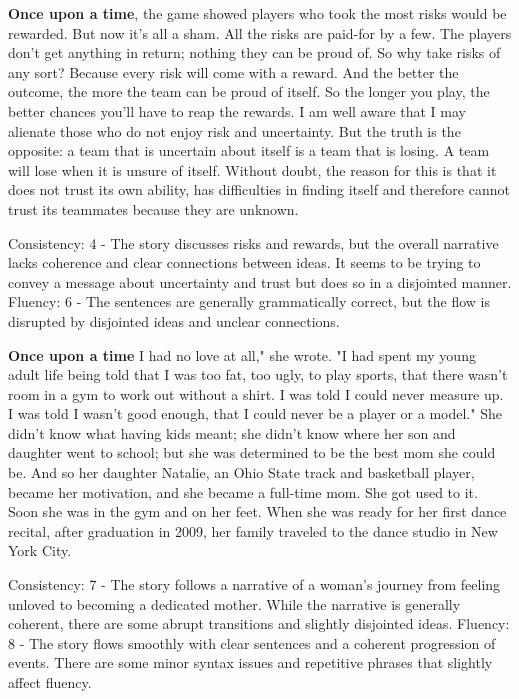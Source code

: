 \documentclass{article}
\begin{document}
\textbf{Once upon a time}, the game showed players who took the most risks would be rewarded. But now it's all a sham. All the risks are paid-for by a few. The players don't get anything in return; nothing they can be proud of. So why take risks of any sort? Because every risk will come with a reward. And the better the outcome, the more the team can be proud of itself. So the longer you play, the better chances you'll have to reap the rewards. I am well aware that I may alienate those who do not enjoy risk and uncertainty. But the truth is the opposite: a team that is uncertain about itself is a team that is losing. A team will lose when it is unsure of itself. Without doubt, the reason for this is that it does not trust its own ability, has difficulties in finding itself and therefore cannot trust its teammates because they are unknown.

Consistency: 4 - The story discusses risks and rewards, but the overall narrative lacks coherence and clear connections between ideas. It seems to be trying to convey a message about uncertainty and trust but does so in a disjointed manner. 
Fluency: 6 - The sentences are generally grammatically correct, but the flow is disrupted by disjointed ideas and unclear connections. 

\textbf{Once upon a time} I had no love at all," she wrote. "I had spent my young adult life being told that I was too fat, too ugly, to play sports, that there wasn't room in a gym to work out without a shirt. I was told I could never measure up. I was told I wasn't good enough, that I could never be a player or a model." She didn't know what having kids meant; she didn't know where her son and daughter went to school; but she was determined to be the best mom she could be. And so her daughter Natalie, an Ohio State track and basketball player, became her motivation, and she became a full-time mom. She got used to it. Soon she was in the gym and on her feet. When she was ready for her first dance recital, after graduation in 2009, her family traveled to the dance studio in New York City.

Consistency: 7 - The story follows a narrative of a woman's journey from feeling unloved to becoming a dedicated mother. While the narrative is generally coherent, there are some abrupt transitions and slightly disjointed ideas. 
Fluency: 8 - The story flows smoothly with clear sentences and a coherent progression of events. There are some minor syntax issues and repetitive phrases that slightly affect fluency.
\end{document}
